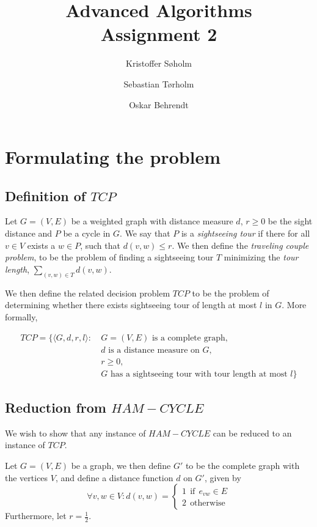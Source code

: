 \documentclass[11pt,a4paper]{article}
\title{Advanced Algorithms\\Assignment 2}
\author{Kristoffer Søholm \and Sebastian Tørholm \and Oskar Behrendt}
\begin{document}
\maketitle

\section{Formulating the problem}
\subsection{Definition of $TCP$}
Let $G = (V, E)$ be a weighted graph with distance measure $d$,
$r \geq 0$ be the sight distance and $P$ be a cycle in $G$. We say
that $P$ is a \emph{sightseeing tour} if there for all $v \in V$ exists a
$w \in P$, such that $d(v, w) \leq r$. We then define the \emph{traveling
couple problem}, to be the problem of finding a sightseeing tour $T$ minimizing
the \emph{tour length}, $\sum_{(v,w) \in T} d(v, w)$.

We then define the related decision problem $TCP$ to be the problem of determining
whether there exists sightseeing tour of length at most $l$ in $G$. More formally,

\begin{align*}
    TCP = \{ \langle G, d, r, l \rangle :\ & G = (V,E) \text{ is a complete graph}, \\
                                           & d \text{ is a distance measure on } G, \\
                                           & r \geq 0, \\
                                           & G \text{ has a sightseeing tour with tour length at most } l \}
\end{align*}

\subsection{Reduction from $HAM-CYCLE$}
We wish to show that any instance of $HAM-CYCLE$ can be reduced to an instance of $TCP$.

Let $G = (V, E)$ be a graph, we then define $G'$ to be the complete graph with
the vertices $V$, and define a distance function $d$ on $G'$, given by
\[
    \forall v, w \in V : d(v, w) = \begin{cases} 1\ \ \text{if}\ \ e_{vw} \in E \\
                                                 2\ \ \text{otherwise}
                                   \end{cases} 
\]
Furthermore, let $r = \frac{1}{2}$.
\end{document}
